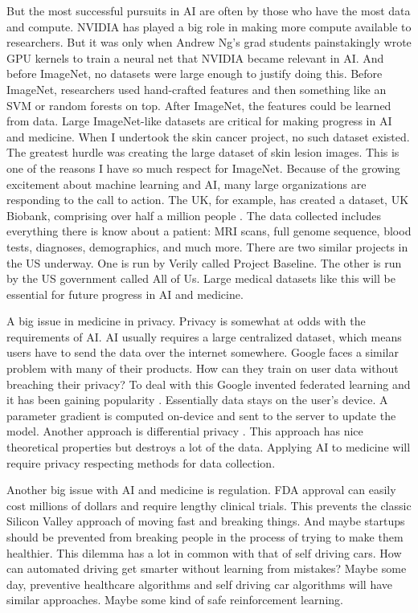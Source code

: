 But the most successful pursuits in AI are often by those who have the most data and compute.  NVIDIA has played a big role in making more compute available to researchers.  But it was only when Andrew Ng's grad students painstakingly wrote GPU kernels to train a neural net \cite{raina2009large} that NVIDIA became relevant in AI. And before ImageNet, no datasets were large enough to justify doing this.  Before ImageNet, researchers used hand-crafted features and then something like an SVM or random forests on top.  After ImageNet, the features could be learned from data.  Large ImageNet-like datasets are critical for making progress in AI and medicine.  When I undertook the skin cancer project, no such dataset existed.  The greatest hurdle was creating the large dataset of skin lesion images.  This is one of the reasons I have so much respect for ImageNet.  Because of the growing excitement about machine learning and AI, many large organizations are responding to the call to action.  The UK, for example, has created a dataset, UK Biobank, comprising over half a million people \cite{sudlow2015uk}.  The data collected includes everything there is know about a patient: MRI scans, full genome sequence, blood tests, diagnoses, demographics, and much more.  There are two similar projects in the US underway.  One is run by Verily called Project Baseline.  The other is run by the US government called All of Us.  Large medical datasets like this will be essential for future progress in AI and medicine.

A big issue in medicine in privacy.  Privacy is somewhat at odds with the requirements of AI.  AI usually requires a large centralized dataset, which means users have to send the data over the internet somewhere.  Google faces a similar problem with many of their products.  How can they train on user data without breaching their privacy?  To deal with this Google invented federated learning and it has been gaining popularity \cite{bonawitz2019towards}.  Essentially data stays on the user's device.  A parameter gradient is computed on-device and sent to the server to update the model.  Another approach is differential privacy \cite{abadi2016deep}.  This approach has nice theoretical properties but destroys a lot of the data.  Applying AI to medicine will require privacy respecting methods for data collection.

Another big issue with AI and medicine is regulation.  FDA approval can easily cost millions of dollars and require lengthy clinical trials.  This prevents the classic Silicon Valley approach of moving fast and breaking things.  And maybe startups should be prevented from breaking people in the process of trying to make them healthier.  This dilemma has a lot in common with that of self driving cars.  How can automated driving get smarter without learning from mistakes?  Maybe some day, preventive healthcare algorithms and self driving car algorithms will have similar approaches.  Maybe some kind of safe reinforcement learning.

